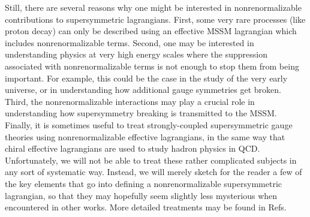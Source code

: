 Still, there are several reasons
why one might be interested in nonrenormalizable contributions to
supersymmetric lagrangians. First, some very rare processes (like proton
decay) can only be described
using an effective MSSM lagrangian which includes nonrenormalizable
terms.
Second, one may be interested in understanding physics at very high energy
scales where the suppression associated with nonrenormalizable terms is
not enough to stop them from being important. For example, this could be
the case in the study of the very early universe, or in
understanding how additional gauge symmetries get broken. Third, the
nonrenormalizable interactions may play a crucial role in understanding
how supersymmetry breaking is transmitted to the MSSM.
Finally, it is sometimes useful to treat strongly-coupled
supersymmetric gauge theories using nonrenormalizable effective
lagrangians, in the same way that chiral effective lagrangians are
used to study hadron physics in QCD. Unfortunately,
we will not be able to treat these rather complicated subjects in any sort
of systematic way.
Instead, we will merely sketch for the reader a few of the key
elements that go into defining a nonrenormalizable supersymmetric
lagrangian, so that they may hopefully seem slightly less mysterious when
encountered in other works. More detailed treatments may be found in
Refs.\cite{BailinLovebook,Nillesreview}

